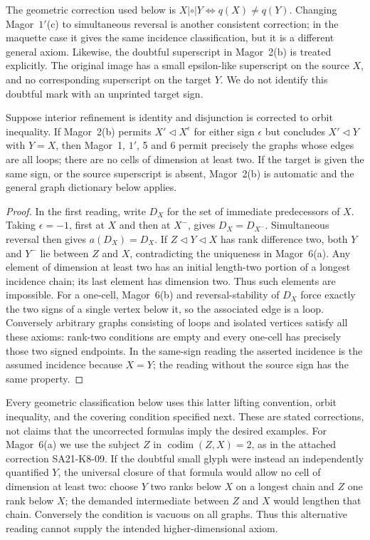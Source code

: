 The geometric correction used below is
$X\mathrel{|\circ|}Y\Longleftrightarrow q(X)\ne q(Y)$.
Changing Magor~$1'$(c) to simultaneous reversal is another consistent
correction; in the maquette case it gives the same incidence classification,
but it is a different general axiom. Likewise, the doubtful superscript
in Magor~2(b) is treated explicitly. The original image has a small
epsilon-like superscript on the source $X$, and no corresponding
superscript on the target $Y$. We do not identify this doubtful mark
with an unprinted target sign.

\begin{proposition}
\label{SA21-C02}
Suppose interior refinement is identity and disjunction is corrected to
orbit inequality. If Magor~2(b) permits $X'\triangleleft X^\epsilon$
for either sign $\epsilon$ but concludes $X'\triangleleft Y$ with
$Y=X$, then Magor~1, $1'$, 5 and 6 permit precisely the graphs whose
edges are all loops; there are no cells of dimension at least two.
If the target is given the same sign, or the source superscript is
absent, Magor~2(b) is automatic and the general graph dictionary below
applies.
\end{proposition}
\begin{proof}
In the first reading, write $D_X$ for the set of immediate predecessors
of $X$. Taking $\epsilon=-1$, first at $X$ and then at $X^-$, gives
$D_X=D_{X^-}$. Simultaneous reversal then gives $a(D_X)=D_X$.
If $Z\triangleleft Y\triangleleft X$ has rank difference two,
both $Y$ and $Y^-$ lie between $Z$ and $X$, contradicting the uniqueness
in Magor~6(a). Any element of dimension at least two has an initial
length-two portion of a longest incidence chain; its last element has
dimension two. Thus such elements are impossible. For a one-cell,
Magor~6(b) and reversal-stability of $D_X$ force exactly the two signs
of a single vertex below it, so the associated edge is a loop.
Conversely arbitrary graphs consisting of loops and isolated vertices
satisfy all these axioms: rank-two conditions are empty and every
one-cell has precisely those two signed endpoints. In the same-sign
reading the asserted incidence is the assumed incidence because
$X=Y$; the reading without the source sign has the same property.
\end{proof}

Every geometric classification below uses this latter lifting convention,
orbit inequality, and the covering condition specified next. These are
stated corrections, not claims that the uncorrected formulas imply the
desired examples.
For Magor~6(a) we use the subject $Z$ in $\operatorname{codim}(Z,X)=2$,
as in the attached correction SA21-K8-09. If the doubtful small glyph
were instead an independently quantified $Y$, the universal closure of
that formula would allow no cell of dimension at least two: choose
$Y$ two ranks below $X$ on a longest chain and $Z$ one rank below $X$;
the demanded intermediate between $Z$ and $X$ would lengthen that
chain. Conversely the condition is vacuous on all graphs. Thus this
alternative reading cannot supply the intended higher-dimensional axiom.

